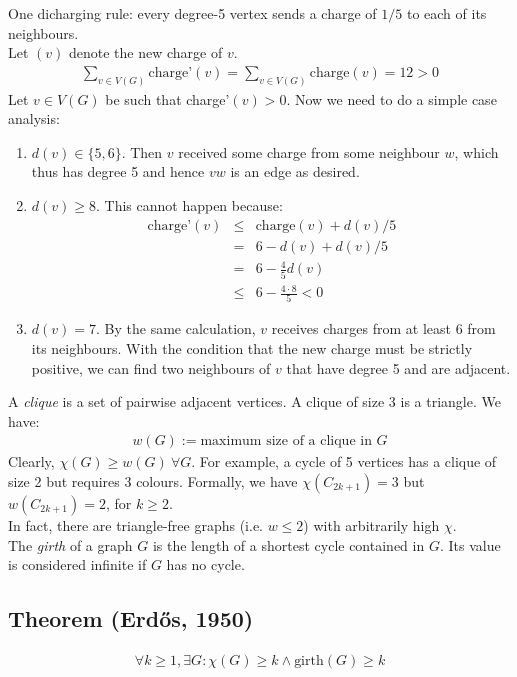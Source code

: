 		One dicharging rule: every degree-5 vertex sends  a charge of $1/5$ to each of its neighbours.\\
		
		Let $(v)$ denote the new charge of $v$. 
		\begin{eqnarray}
			\sum_{v \in V(G)} \text{charge'}(v) = \sum_{v \in V(G)} \text{charge}(v) = 12 > 0
		\end{eqnarray}
		Let $v \in V(G)$ be such that charge'$(v) > 0$. Now we need to do a simple case analysis:
		\begin{enumerate}
			\item $d(v) \in \{ 5,  6 \}$. Then $v$ received some charge from some neighbour $w$, which thus has degree 5 and hence $vw$ is an edge as desired.
			\item $d(v) \geq 8$. This cannot happen because:
				\begin{eqnarray}
					\text{charge'}(v) &\leq&  \text{charge}(v) + d(v)/5\\
					&=& 6 - d(v) + d(v)/5\\
					&=& 6 - \frac{4}{5}d(v)\\
					&\leq& 6 - \frac{4 \cdot 8}{5} < 0
				\end{eqnarray}
			\item $d(v) = 7$. By the same calculation, $v$ receives charges from at least 6 from its neighbours. With the condition that the new charge must be strictly positive, we can find two neighbours of $v$ that have degree 5 and are adjacent.
		\end{enumerate}
		
	A \textit{clique} is a set of pairwise adjacent vertices. A clique of size 3 is a triangle. We have:
	\begin{eqnarray}
		w(G)  := \text{maximum size of a clique in }G
	\end{eqnarray}
	Clearly, $\chi(G) \geq w(G) ~\forall G$. For example, a cycle of 5 vertices has a clique of size 2 but requires 3 colours. Formally, we have $\chi(C_{2k + 1}) = 3$ but $w(C_{2k + 1}) = 2$, for $k \geq 2$.\\
	
	In fact, there are triangle-free graphs (i.e. $w \leq 2$) with arbitrarily high $\chi$.\\
	
	The \textit{girth} of a graph $G$ is the length of a shortest cycle contained in $G$. Its value is considered infinite if $G$ has no cycle.
	
		\subsection{Theorem (Erdős, 1950)}
		\begin{eqnarray}
			\forall k \geq 1, \exists G : \chi(G) \geq k \wedge \text{girth}(G) \geq k
		\end{eqnarray}
		
